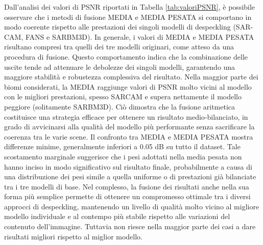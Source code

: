Dall’analisi dei valori di PSNR riportati in Tabella \ref{tab:valoriPSNR}, è possibile osservare che i metodi di fusione 
MEDIA e MEDIA PESATA si comportano in modo coerente rispetto alle prestazioni dei singoli modelli di despeckling (SAR-CAM, FANS e SARBM3D). 
In generale, i valori di MEDIA e MEDIA PESATA risultano compresi tra quelli dei tre modelli originari, come atteso da una procedura di 
fusione. Questo comportamento indica che la combinazione delle uscite tende ad attenuare le debolezze dei singoli modelli, garantendo una 
maggiore stabilità e robustezza complessiva del risultato.
Nella maggior parte dei biomi considerati, la MEDIA raggiunge valori di PSNR molto vicini al modello con le migliori prestazioni, spesso SARCAM e 
supera nettamente il modello peggiore (solitamente SARBM3D). Ciò dimostra che la fusione aritmetica costituisce una strategia efficace per 
ottenere un risultato medio-bilanciato, in grado di avvicinarsi alla qualità del modello più performante senza sacrificare la coerenza tra le varie scene.
Il confronto tra MEDIA e MEDIA PESATA mostra differenze minime, generalmente inferiori a 0.05 dB su tutto il dataset. Tale scostamento 
marginale suggerisce che i pesi adottati nella media pesata non hanno inciso in modo significativo sul risultato finale, probabilmente a 
causa di una distribuzione dei pesi simile a quella uniforme o di prestazioni già bilanciate tra i tre modelli di base.
Nel complesso, la fusione dei risultati anche nella sua forma più semplice permette di ottenere un compromesso ottimale tra i diversi 
approcci di despeckling, mantenendo un livello di qualità molto vicino al migliore modello individuale e al contempo più 
stabile rispetto alle variazioni del contenuto dell’immagine. Tuttavia non riesce nella maggior parte dei casi a dare 
risultati migliori rispetto al miglior modello.
    




